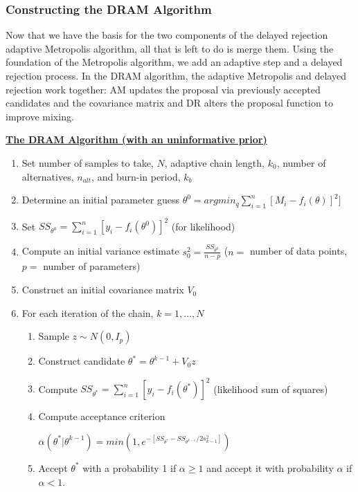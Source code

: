 \subsubsection{Constructing the DRAM Algorithm}
Now that we have the basis for the two components of the delayed rejection adaptive Metropolis algorithm, all that is left to do is merge them. Using the foundation of the Metropolis algorithm, we add an adaptive step and a delayed rejection process. In the DRAM algorithm, the adaptive Metropolis and delayed rejection work together: AM updates the proposal via previously accepted candidates and the covariance matrix and DR alters the proposal function to improve mixing.
\begin{tcolorbox}
\textbf{\underline{The DRAM Algorithm (with an uninformative prior)}} 
\begin{enumerate}
\item Set number of samples to take, $N$, adaptive chain length, $k_0$, number of alternatives, $n_{alt}$, and burn-in period, $k_b$
    \item Determine an initial parameter guess $\theta^0 = argmin_q \sum_{i=1}^{n}[M_i - f_i(\theta)]^2]$
    \item Set $SS_{\theta^0} = \sum_{i = 1}^{n}[y_i - f_i(\theta^0)]^2$ (for likelihood)
    \item Compute an initial variance estimate $s_0^2 = \frac{SS_{\theta^0}}{n-p}$ ($n =$ number of data points, $p = $ number of parameters)
    \item Construct an initial covariance matrix $V_0$ 
    \item For each iteration of the chain, $k = 1,...,N$
    \begin{enumerate}
        \item Sample $z \sim N(0,I_p)$
        \item Construct candidate $\theta^* = \theta^{k-1}+ V_0z$
        \item Compute $SS_{\theta^*} = \sum_{i = 1}^{n}[y_i - f_i(\theta^*)]^2$ (likelihood sum of squares)
        \item Compute acceptance criterion
            \begin{center}
                $\alpha(\theta^* | \theta^{k-1}) = min(1, e^{-[SS_{\theta^*}-SS_{\theta^{k-1}}/2s_{k-1}^2]})$
            \end{center}
        \item Accept $\theta^*$ with a probability 1 if $\alpha \geq 1$ and accept it with probability $\alpha$ if $\alpha < 1$.
        \begin{tcolorbox}[colback=red!5,colframe=red!75!black,title=DRAM Step]

\end{tcolorbox}
\end{enumerate}
\end{enumerate}
\end{tcolorbox}
